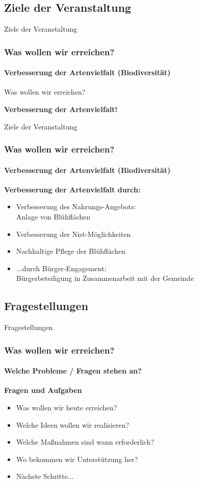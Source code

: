 \documentclass[aspectratio=169]{beamer}
\begin{document}
\subsection[Ziele]{Ziele der Veranstaltung}

\begin{frame}{Ziele der Veranstaltung}
\frametitle{Was wollen wir erreichen?} 
\framesubtitle{Verbesserung der Artenvielfalt (Biodiversität)}

\begin{block}{Was wollen wir erreichen?}
\begin{center}	
		\textbf{Verbesserung der Artenvielfalt!}
	\end{center}
\end{block}
\end{frame}

\begin{frame}{Ziele der Veranstaltung}
	\frametitle{Was wollen wir erreichen?} 
	\framesubtitle{Verbesserung der Artenvielfalt (Biodiversität)}

	\textbf{Verbesserung der Artenvielfalt durch:}
\begin{itemize} 
	\item 
		Verbesserung des Nahrungs-Angebots:	\\
		Anlage von Blühflächen \pause
	\item 
		Verbesserung der Nist-Möglichkeiten	 \pause
	\item 
		Nachhaltige Pflege der Blühflächen \pause
	\item 
		...durch Bürger-Engagement:\\
		Bürgerbeteiligung in Zusammenarbeit mit der Gemeinde%
\end{itemize}
\end{frame}

\subsection{Fragestellungen}

\begin{frame}{Fragestellungen}
\frametitle{Was wollen wir erreichen?} 
\framesubtitle{Welche Probleme / Fragen stehen an?}
\textbf{Fragen und Aufgaben}\\
\begin{itemize}
	\item 
		Was wollen wir heute erreichen? \pause 
	\item 
		Welche Ideen wollen wir realisieren? \pause
	\item 
		Welche Maßnahmen sind wann erforderlich? \pause
	\item 
		Wo bekommen wir Unterstützung her? \pause
	\item  
		Nächste Schritte...%
\end{itemize}
\end{frame}
\end{document}
